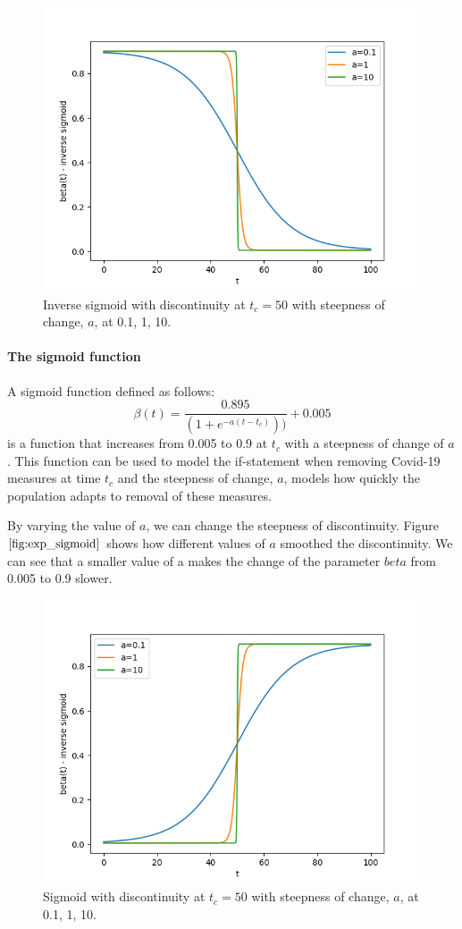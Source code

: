 \begin{figure}[H]
\centering
\includegraphics[width=0.7\linewidth]{./figures/exp_inverse_sigmoid}
\caption{Inverse sigmoid with discontinuity at $t_c=50$ with steepness of change, $a$, at 0.1, 1, 10.}
\label{fig:exp_inverse_sigmoid}
\end{figure}

\paragraph{The sigmoid function}
A sigmoid function defined as follows:
\begin{equation}
    \beta(t) = \frac{0.895}{(1 + e^{-a(t - t_c)}))} + 0.005
\end{equation}
is a function that increases from 0.005 to 0.9 at $t_c$ with a steepness of change of $a$.
This function can be used to model the if-statement when removing Covid-19 measures at time $t_c$ and the steepness of change, $a$, models how quickly the population adapts to removal of these measures.

By varying the value of $a$, we can change the steepness of discontinuity. Figure $\ref{fig:exp_sigmoid}$ shows how different values of $a$ smoothed the discontinuity. We can see that a smaller value of a makes the change of the parameter $beta$ from 0.005 to 0.9 slower.

\begin{figure}[H]
\centering
\includegraphics[width=0.7\linewidth]{./figures/exp_sigmoid}
\caption{Sigmoid with discontinuity at $t_c=50$ with steepness of change, $a$, at 0.1, 1, 10.}
\label{fig:exp_sigmoid}
\end{figure}

